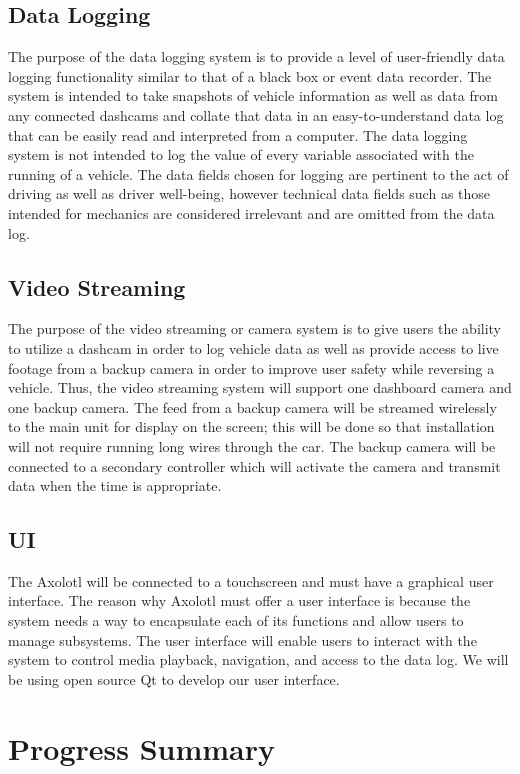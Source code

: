 \documentclass[onecolumn, draftclsnofoot,10pt, compsoc]{IEEEtran}
\begin{document}
\subsection{Data Logging}
The purpose of the data logging system is to provide a level of user-friendly data logging functionality similar to that of a black box or event data recorder. The system is intended to take snapshots of vehicle information as well as data from any connected dashcams and collate that data in an easy-to-understand data log that can be easily read and interpreted from a computer. The data logging system is not intended to log the value of every variable associated with the running of a vehicle. The data fields chosen for logging are pertinent to the act of driving as well as driver well-being, however technical data fields such as those intended for mechanics are considered irrelevant and are omitted from the data log.

\subsection{Video Streaming}
The purpose of the video streaming or camera system is to give users the ability to utilize a dashcam in order to log vehicle data as well as provide access to live footage from a backup camera in order to improve user safety while reversing a vehicle. Thus, the video streaming system will support one dashboard camera and one backup camera. The feed from a backup camera will be streamed wirelessly to the main unit for display on the screen; this will be done so that installation will not require running long wires through the car. The backup camera will be connected to a secondary controller which will activate the camera and transmit data when the time is appropriate.

\subsection{UI}
The Axolotl will be connected to a touchscreen and must have a graphical user interface. The reason why Axolotl must offer a user interface is because the system needs a way to encapsulate each of its functions and allow users to manage subsystems. The user interface will enable users to interact with the system to control media playback, navigation, and access to the data log. We will be using open source Qt to develop our user interface. 

\section{Progress Summary}
\end{document}

